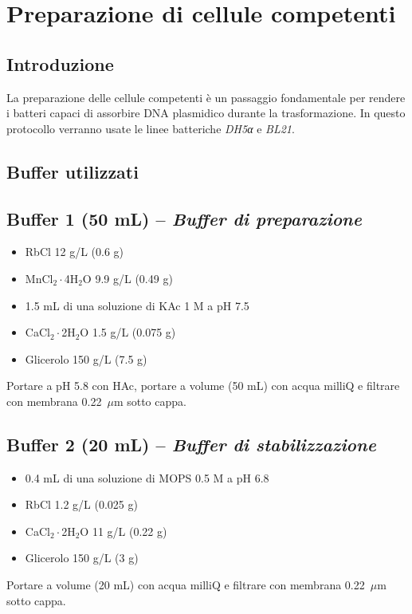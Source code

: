 \section {Preparazione di cellule competenti}

\subsection{Introduzione}

La preparazione delle cellule competenti è un passaggio fondamentale per rendere i batteri capaci di assorbire DNA plasmidico durante la trasformazione. In questo protocollo verranno usate le linee batteriche \textit{DH5α} e \textit{BL21}.

\subsection{Buffer utilizzati}

\subsection*{Buffer 1 (50 mL) – \textit{Buffer di preparazione}}
\begin{itemize}\footnotesize
  \item RbCl 12 g/L (0.6 g)
  \item MnCl$_2\cdot$4H$_2$O 9.9 g/L (0.49 g)
  \item 1.5 mL di una soluzione di KAc 1 M a pH 7.5
  \item CaCl$_2\cdot$2H$_2$O 1.5 g/L (0.075 g)
  \item Glicerolo 150 g/L (7.5 g)
\end{itemize}
Portare a pH 5.8 con HAc, portare a volume (50 mL) con acqua milliQ e filtrare con membrana 0.22~$\mu$m sotto cappa.

\subsection*{Buffer 2 (20 mL) – \textit{Buffer di stabilizzazione}}
\begin{itemize}\footnotesize
  \item 0.4 mL di una soluzione di MOPS 0.5 M a pH 6.8
  \item RbCl 1.2 g/L (0.025 g)
  \item CaCl$_2\cdot$2H$_2$O 11 g/L (0.22 g)
  \item Glicerolo 150 g/L (3 g)
\end{itemize}
Portare a volume (20 mL) con acqua milliQ e filtrare con membrana 0.22~$\mu$m sotto cappa.

